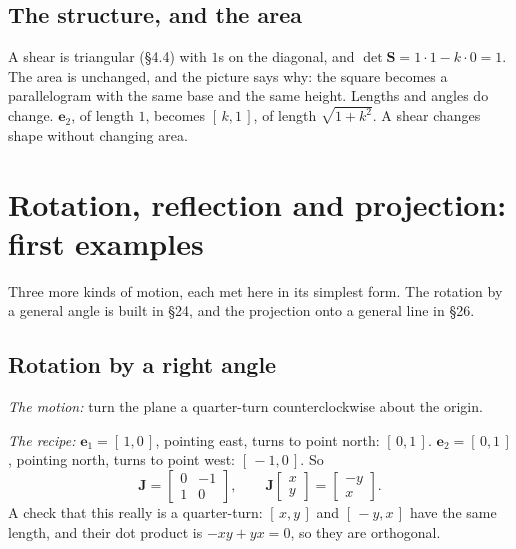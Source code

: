 \documentclass[11pt]{article}
\theoremstyle{plain}
\theoremstyle{definition}
\theoremstyle{remark}
\newcommand{\vc}[1]{\mathbf{#1}}
\newcommand{\mt}[1]{\mathbf{#1}}
\begin{document}
\subsection{The structure, and the area}
A shear is triangular (\S4.4) with $1$s on the diagonal, and
$\det\mt{S}=1\cdot1-k\cdot0=1$. The area is unchanged, and the picture says
why: the square becomes a parallelogram with the same base and the same height.
Lengths and angles do change. $\vc{e}_2$, of length $1$, becomes $[\,k,1\,]$, of
length $\sqrt{1+k^{2}}$. A shear changes shape without changing area.

\section{Rotation, reflection and projection: first examples}
Three more kinds of motion, each met here in its simplest form. The rotation by
a general angle is built in \S24, and the projection onto a general line in
\S26.

\subsection{Rotation by a right angle}
\emph{The motion:} turn the plane a quarter-turn counterclockwise about the
origin.

\emph{The recipe:} $\vc{e}_1=[\,1,0\,]$, pointing east, turns to point north:
$[\,0,1\,]$. $\vc{e}_2=[\,0,1\,]$, pointing north, turns to point west:
$[\,-1,0\,]$. So
\[
  \mt{J}=\begin{bmatrix}0&-1\\1&0\end{bmatrix},
  \qquad
  \mt{J}\begin{bmatrix}x\\y\end{bmatrix}=\begin{bmatrix}-y\\x\end{bmatrix}.
\]
A check that this really is a quarter-turn: $[\,x,y\,]$ and $[\,-y,x\,]$ have
the same length, and their dot product is $-xy+yx=0$, so they are orthogonal.
\end{document}
